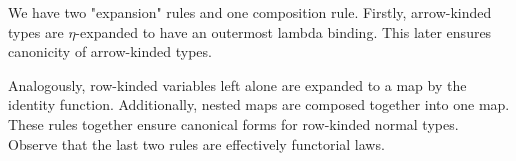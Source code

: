 \documentclass[authoryear, acmsmall, screen, review, nonacm]{acmart}
\begin{document}
We have two "expansion" rules and one composition rule. Firstly, arrow-kinded types are $\eta$-expanded to have an outermost lambda binding. This later ensures canonicity of arrow-kinded types. 

\begin{code}    %
%
\>[4]\AgdaSpace{}%
\AgdaSymbol{:}\AgdaSpace{}%
\AgdaSpace{}%
\AgdaSymbol{\{}\AgdaSpace{}%
\AgdaSymbol{:}\AgdaSpace{}%
\AgdaSpace{}%
\AgdaSpace{}%
\AgdaSymbol{(}\AgdaSpace{}%
\AgdaSpace{}%
\AgdaSymbol{)\}}\AgdaSpace{}%
\AgdaSpace{}%
\AgdaSpace{}%
\AgdaSpace{}%
\AgdaSpace{}%
\AgdaSymbol{(}\AgdaSpace{}%
\AgdaSpace{}%
\AgdaSpace{}%
\AgdaSymbol{(}\AgdaSpace{}%
\AgdaSymbol{))}\<%
\end{code}

\Ni Analogously, row-kinded variables left alone are expanded to a map by the identity function. Additionally, nested maps are composed together into one map. These rules together ensure canonical forms for row-kinded normal types. Observe that the last two rules are effectively functorial laws.
\end{document}
